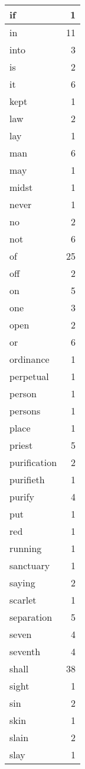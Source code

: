 \begin{center}
\begin{longtable}{l|r}
if & 1 \\ \hline
in & 11 \\ \hline
into & 3 \\ \hline
is & 2 \\ \hline
it & 6 \\ \hline
kept & 1 \\ \hline
law & 2 \\ \hline
lay & 1 \\ \hline
man & 6 \\ \hline
may & 1 \\ \hline
midst & 1 \\ \hline
never & 1 \\ \hline
no & 2 \\ \hline
not & 6 \\ \hline
of & 25 \\ \hline
off & 2 \\ \hline
on & 5 \\ \hline
one & 3 \\ \hline
open & 2 \\ \hline
or & 6 \\ \hline
ordinance & 1 \\ \hline
perpetual & 1 \\ \hline
person & 1 \\ \hline
persons & 1 \\ \hline
place & 1 \\ \hline
priest & 5 \\ \hline
purification & 2 \\ \hline
purifieth & 1 \\ \hline
purify & 4 \\ \hline
put & 1 \\ \hline
red & 1 \\ \hline
running & 1 \\ \hline
sanctuary & 1 \\ \hline
saying & 2 \\ \hline
scarlet & 1 \\ \hline
separation & 5 \\ \hline
seven & 4 \\ \hline
seventh & 4 \\ \hline
shall & 38 \\ \hline
sight & 1 \\ \hline
sin & 2 \\ \hline
skin & 1 \\ \hline
slain & 2 \\ \hline
slay & 1 \\ \hline

\end{longtable}
\end{center}
